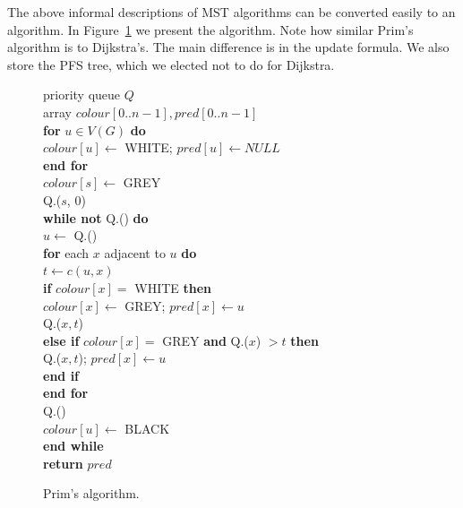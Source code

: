 The above informal descriptions of MST algorithms can be converted easily
to an algorithm. In Figure~\ref{fig:primcode} we present the algorithm. Note
how similar Prim's algorithm is to Dijkstra's. The main difference is
in the update formula. We also store the PFS tree, which we elected not
to do for Dijkstra.

\begin{figure}
\hspace*{.3in}\begin{minipage}{5in}
{
\> priority queue $Q$ \\
\> array $colour[0..n-1], pred[0..n-1]$ \\
\> \textbf{for} $u\in V(G)$ \textbf{do} \\
\> \> $colour[u] \gets$ WHITE; $pred[u] \gets NULL$  \\
\> \textbf{end for} \\
\> $colour[s] \gets $ GREY \\
\> Q.($s$, $0$) \\
\> \textbf{while not} Q.() \textbf{do} \\
\> \> $u \gets $ Q.() \\
\> \> \textbf{for} each $x$ adjacent to $u$ \textbf{do} \\
\> \> \> $t \gets c(u, x)$ \\
\> \> \>  \textbf{if} $colour[x] = $ WHITE \textbf{then} \\
\> \> \> \> $colour[x] \gets $ GREY; $pred[x] \gets u$ \\
\> \> \> \> Q.($x, t$) \\
\> \> \> \textbf{else if} $colour[x] = $ GREY \textbf{and} Q.($x$) $ > t$ \textbf{then} \\
\> \> \> \> Q.($x, t$); $pred[x] \gets u$ \\
\> \> \> \textbf{end if} \\
\> \> \textbf{end for} \\
\> \> Q.() \\
\> \> $colour[u] \gets $ BLACK \\
\> \textbf{end while} \\
\> \textbf{return} $pred$ \\
}
\end{minipage}
\caption{Prim's algorithm.}
\label{fig:primcode}
\end{figure}


